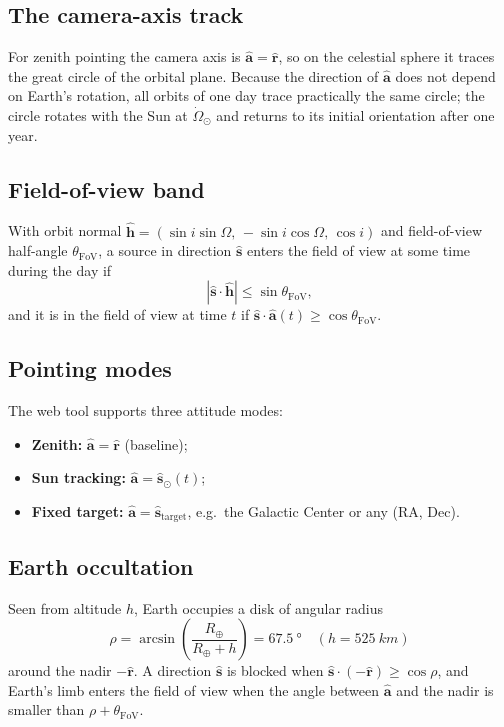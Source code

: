\documentclass[a4paper,fleqn]{cas-sc}
\newif\ifshowtodos
\newcommand{\todo}[1]{\ifshowtodos{\color{red!70!black}\textbf{[TODO:} #1\textbf{]}}\fi}
\newcommand{\RE}{R_{\oplus}}
\newcommand{\vect}[1]{\hat{\mathbf{#1}}}
\begin{document}
\subsection{The camera-axis track}
For zenith pointing the camera axis is $\vect{a}=\vect{r}$, so on the
celestial sphere it traces the great circle of the orbital plane. Because the
direction of $\vect{a}$ does not depend on Earth's rotation, all orbits of one
day trace practically the same circle; the circle rotates with the Sun at
$\dot\Omega_\odot$ and returns to its initial orientation after one year.
\todo{Add a schematic figure if helpful.}

\subsection{Field-of-view band}
With orbit normal
$\vect{h}=(\sin i\sin\Omega,\,-\sin i\cos\Omega,\,\cos i)$ and field-of-view
half-angle $\theta_{\mathrm{FoV}}$, a source in direction $\vect{s}$ enters
the field of view at some time during the day if
\begin{equation}
  |\vect{s}\cdot\vect{h}|\le\sin\theta_{\mathrm{FoV}},
  \label{eq:band}
\end{equation}
and it is in the field of view at time $t$ if
$\vect{s}\cdot\vect{a}(t)\ge\cos\theta_{\mathrm{FoV}}$.

\subsection{Pointing modes}
\label{sec:pointing}
The web tool supports three attitude modes:
\begin{itemize}
  \item \textbf{Zenith:} $\vect{a}=\vect{r}$ (baseline);
  \item \textbf{Sun tracking:} $\vect{a}=\vect{s}_\odot(t)$;
  \item \textbf{Fixed target:} $\vect{a}=\vect{s}_{\mathrm{target}}$, e.g.\
        the Galactic Center or any (RA, Dec).
\end{itemize}
\todo{Which modes the platform can actually support; slew-rate and Sun-avoidance
constraints; thermal implications of Sun pointing.}

\subsection{Earth occultation}
Seen from altitude $h$, Earth occupies a disk of angular radius
\begin{equation}
  \rho=\arcsin\!\left(\frac{\RE}{\RE+h}\right)=\SI{67.5}{\degree}
  \quad(h=\SI{525}{km})
  \label{eq:rho}
\end{equation}
around the nadir $-\vect{r}$. A direction $\vect{s}$ is blocked when
$\vect{s}\cdot(-\vect{r})\ge\cos\rho$, and Earth's limb enters the field of
view when the angle between $\vect{a}$ and the nadir is smaller than
$\rho+\theta_{\mathrm{FoV}}$. \todo{Atmospheric absorption: an effective
height of $\sim\SI{100}{km}$ increases $\rho$ to $\approx\SI{69.8}{\degree}$;
discuss the energy dependence and Earth albedo background.}
\end{document}
